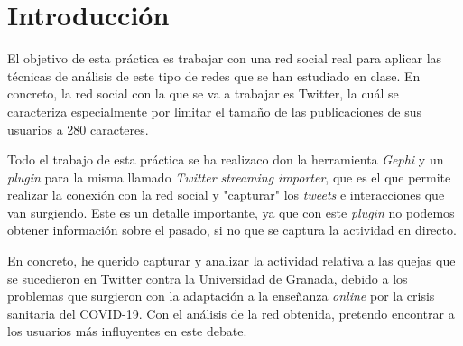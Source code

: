 \section{Introducción}

El objetivo de esta práctica es trabajar con una red social real para aplicar
las técnicas de análisis de este tipo de redes que se han estudiado en clase. En
concreto, la red social con la que se va a trabajar es Twitter, la cuál se
caracteriza especialmente por limitar el tamaño de las publicaciones de sus
usuarios a 280 caracteres.

Todo el trabajo de esta práctica se ha realizaco don la herramienta
\textit{Gephi} y un \textit{plugin} para la misma llamado \textit{Twitter
    streaming importer}, que es el que permite realizar la conexión con la red
social y "capturar" los \textit{tweets} e interacciones que van surgiendo. Este
es un detalle importante, ya que con este \textit{plugin} no podemos obtener
información sobre el pasado, si no que se captura la actividad en directo.

En concreto, he querido capturar y analizar la actividad relativa a las quejas
que se sucedieron en Twitter contra la Universidad de Granada, debido a los
problemas que surgieron con la adaptación a la enseñanza \textit{online} por la
crisis sanitaria del COVID-19. Con el análisis de la red obtenida, pretendo
encontrar a los usuarios más influyentes en este debate.
